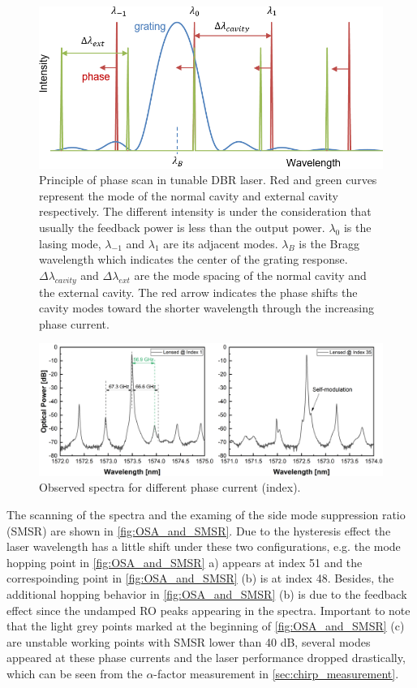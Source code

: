 \begin{figure}[ht]
    \centering
    \includegraphics[width=.7\linewidth]{figures/cavity_modes_and_ext_modes_model.png}
    \caption{Principle of phase scan in tunable DBR laser. Red and green curves represent the mode of the normal cavity and external cavity respectively. The different intensity is under the consideration that usually the feedback power is less than the output power. $\lambda_0$ is the lasing mode, $\lambda_{-1}$ and $\lambda_{1}$ are its adjacent modes. $\lambda_B$ is the Bragg wavelength which indicates the center of the grating response. $\Delta\lambda_{cavity}$ and $\Delta\lambda_{ext}$ are the mode spacing of the normal cavity and the external cavity. The red arrow indicates the phase shifts the cavity modes toward the shorter wavelength through the increasing phase current. }
    \label{fig:cavity_modes_and_ext_modes_model}
\end{figure}
\begin{figure}[ht]
    \centering
    \includegraphics[width=\linewidth]{figures/spectra_lensed_4621.png}
    \caption{Observed spectra for different phase current (index). }
    \label{fig:spectra_lensed_4621}
\end{figure}

The scanning of the spectra and the examing of the side mode suppression ratio (SMSR) are shown in \autoref{fig:OSA_and_SMSR}. Due to the hysteresis effect the laser wavelength has a little shift under these two configurations, e.g. the mode hopping point in \autoref{fig:OSA_and_SMSR} a) appears at index 51 and the correspoinding point in \autoref{fig:OSA_and_SMSR} (b) is at index 48. Besides, the additional hopping behavior in \autoref{fig:OSA_and_SMSR} (b) is due to the feedback effect since the undamped RO peaks appearing in the spectra. Important to note that the light grey points marked at the beginning of \autoref{fig:OSA_and_SMSR} (c) are unstable working points with SMSR lower than 40 dB, several modes appeared at these phase currents and the laser performance dropped drastically, which can be seen from the $\alpha$-factor measurement in \autoref{sec:chirp_measurement}.

